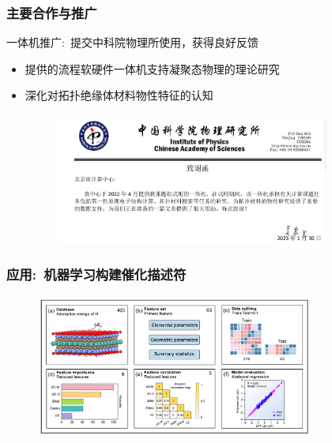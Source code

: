 \begin{frame}
	\frametitle{主要合作与推广}
一体机推广:~提交中科院物理所使用，获得良好反馈
	\begin{itemize}
	 \setlength{\itemsep}{10pt}
		\item 提供的流程软硬件一体机支持凝聚态物理的理论研究
		\item 深化对拓扑绝缘体材料物性特征的认知%
\begin{figure}[h!]
\centering
\vskip 5pt
\includegraphics[height=1.7in]{Figures/Acknowledge-IP_CAS-BCC.png}
\label{Acknowleges-IP_CAS}
\end{figure}
	\end{itemize}
\end{frame}

\begin{frame}
	\frametitle{应用:~机器学习构建催化描述符}
\begin{figure}[h!]
\centering
\includegraphics[height=1.85in]{Figures/MP_comp_BCC-4.png}
\label{MP_comp_BCC_4}
\end{figure}
{\fontsize{7.5pt}{5.5pt}}
\end{frame}

